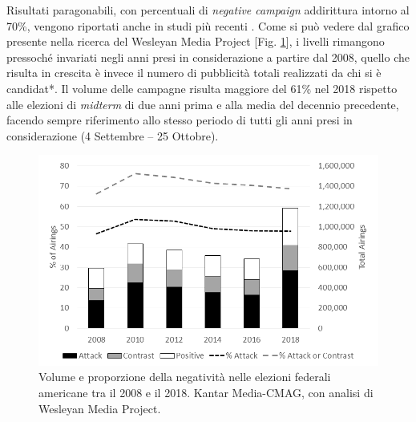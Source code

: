 Risultati paragonabili, con percentuali di \textit{negative campaign} addirittura intorno al 70\%, vengono riportati anche in studi più recenti \citep{media2018}. Come si può vedere dal grafico presente nella ricerca del Wesleyan Media Project [Fig. \ref{fig:negativa2}], i livelli rimangono pressoché invariati negli anni presi in considerazione a partire dal 2008, quello che risulta in crescita è invece il numero di pubblicità totali realizzati da chi si è candidat*. Il volume delle campagne risulta maggiore del 61\% nel 2018 rispetto alle elezioni di \textit{midterm} di due anni prima e alla media del decennio precedente, facendo sempre riferimento allo stesso periodo di tutti gli anni presi in considerazione (4 Settembre – 25 Ottobre).
\begin{figure}
	\includegraphics[width=\textwidth]{figures/negativa2}
	\caption{Volume e proporzione della negatività nelle elezioni federali americane tra il 2008 e il 2018. Kantar Media-CMAG, con analisi di Wesleyan Media Project.}
	\label{fig:negativa2}
\end{figure}

